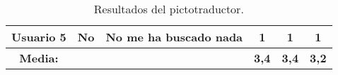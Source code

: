 \begin{table}[H]
{\begin{tabular}{c|ccccc|}
            \multicolumn{1}{|c|}{\textbf{Usuario   5}} & \multicolumn{1}{c|}{No}                                                     & \multicolumn{1}{c|}{No   me ha buscado nada}                                                                                                                                                                                                                                                                                                                                                                                                                                                                              & \multicolumn{1}{c|}{1}                                                                                                                                                    & \multicolumn{1}{c|}{1}                                                                                                                                                                                   & 1                                                                                                                                                                                                 \\ \hline
            \multicolumn{1}{|c|}{\textbf{Media:}}      & \multicolumn{1}{c|}{}                                                       & \multicolumn{1}{c|}{}                                                                                                                                                                                                                                                                                                                                                                                                                                                                                                     & \multicolumn{1}{c|}{\textbf{3,4}}                                                                                                                                                  & \multicolumn{1}{c|}{\textbf{3,4}}                                                                                                                                                                                 & \textbf{3,2}                                                                                                                                                                                               \\ \hline
        \end{tabular}
    }
    \caption{Resultados del pictotraductor.}
    \label{tab:resultadosPictotraductor}
\end{table}

